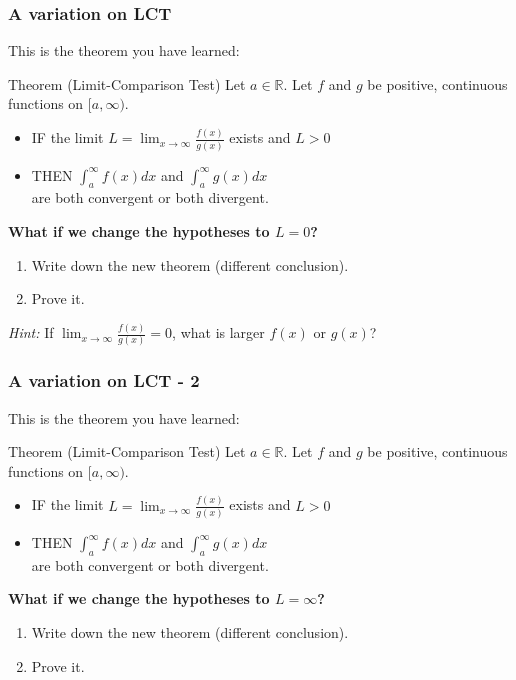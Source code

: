 \documentclass[14pt]{beamer}
\newcommand{\R}{\mathbb{R}}
\newcommand{\p}{\pause}
\newcommand{\setsize}[1]{\fontsize{#1}{#1}\selectfont} %
\newcommand{\smallerfont}{\setsize{13}} %
\begin{document}
	\begin{frame}[t]
		\setsize{12}
		\frametitle{A variation on LCT}

		This is the theorem you have learned:
		\begin{block}{\smallerfont Theorem (Limit-Comparison Test)}
			Let ${\displaystyle a \in \R}$. Let $f$ and $g$ be positive, continuous functions
			on ${\displaystyle [a, \infty)}$.
			\begin{itemize}
				\item IF the limit \; ${\displaystyle  L = \lim_{x \to \infty} \frac{f(x)}{g(x)} }$
					\; exists and \; ${\displaystyle L>0}$

				\item THEN ${\displaystyle  \int_a^{\infty} \! \! f(x) dx}$ \; and \; ${\displaystyle  \int_a^{\infty} \! \! g(x) dx }$
					\\ are both convergent or both divergent.
			\end{itemize}
		\end{block}

		\p
		\vspace{.2cm}
		{\bf What if we change the hypotheses to $L=0$?}
		\begin{enumerate}
			\item Write down the new theorem (different conclusion).

			\item Prove it.
		\end{enumerate}

		\p
		\vspace{.2cm}
		\emph{Hint:} If ${\displaystyle \lim_{x \to \infty} \frac{f(x)}{g(x)}=0 }$,
		what is larger $f(x)$ or $g(x)$?
	\end{frame}
	\begin{frame}[t]
		\setsize{12}
		\frametitle{A variation on LCT - 2}

		This is the theorem you have learned:
		\begin{block}{\smallerfont Theorem (Limit-Comparison Test)}
			Let ${\displaystyle a \in \R}$. Let $f$ and $g$ be positive, continuous functions
			on ${\displaystyle [a, \infty)}$.
			\begin{itemize}
				\item IF the limit \; ${\displaystyle  L = \lim_{x \to \infty} \frac{f(x)}{g(x)} }$
					\; exists and \; ${\displaystyle L>0}$

				\item THEN ${\displaystyle  \int_a^{\infty} \! \! f(x) dx}$ \; and \; ${\displaystyle  \int_a^{\infty} \! \! g(x) dx }$
					\\ are both convergent or both divergent.
			\end{itemize}
		\end{block}

		\vspace{.2cm}
		{\bf What if we change the hypotheses to $L=\infty$?}
		\begin{enumerate}
			\item Write down the new theorem (different conclusion).

			\item Prove it.
		\end{enumerate}
	\end{frame}
\end{document}
